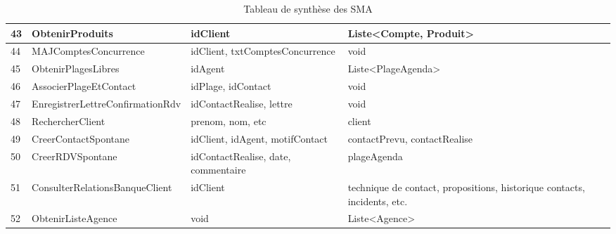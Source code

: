 \begin{table}
{\begin{tabular}{p{1cm}|p{5cm}p{6cm}p{6cm}}
            43 & ObtenirProduits                    & idClient                                                      & Liste<Compte, Produit>\\ \hline
            44 & MAJComptesConcurrence              & idClient, txtComptesConcurrence                               & void \\ \hline
            45 & ObtenirPlagesLibres                & idAgent                                                       & Liste<PlageAgenda>\\ \hline
            46 & AssocierPlageEtContact             & idPlage, idContact                                            & void\\ \hline
            47 & EnregistrerLettreConfirmationRdv   & idContactRealise, lettre                                      & void\\ \hline
            48 & RechercherClient                   & prenom, nom, etc                                              & client\\ \hline
            49 & CreerContactSpontane               & idClient, idAgent, motifContact                               & contactPrevu, contactRealise\\ \hline
            50 & CreerRDVSpontane                   & idContactRealise, date, commentaire                           & plageAgenda \\ \hline 
            51 & ConsulterRelationsBanqueClient & idClient & technique de contact, propositions, historique contacts, incidents, etc. \\ \hline
            52 & ObtenirListeAgence & void & Liste<Agence> \\
        \end{tabular}
        }
        \caption{Tableau de synthèse des SMA}
\end{table}



